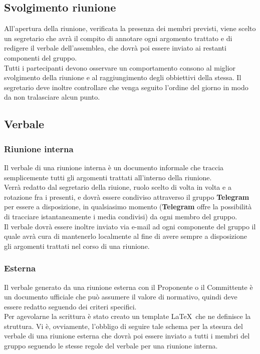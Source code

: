     \subsection{Svolgimento riunione}
      All’apertura della riunione, verificata la presenza dei membri previsti, viene scelto un segretario che avrà il compito di annotare ogni argomento trattato e di redigere il verbale
      dell’assemblea, che dovrà poi essere inviato ai restanti componenti del gruppo.\\
      Tutti i partecipanti devono osservare un comportamento consono al miglior svolgimento della riunione e al raggiungimento degli obbiettivi della stessa. Il segretario deve inoltre
      controllare che venga seguito l’ordine del giorno in modo da non tralasciare alcun punto.
    \subsection{Verbale}
      \subsubsection{Riunione interna}
        Il verbale di una riunione interna è un documento informale che traccia semplicemente tutti gli argomenti trattati all'interno della riunione.\\
        Verrà redatto dal segretario della riuione, ruolo scelto di volta in volta e a rotazione fra i presenti, e dovrà essere condiviso attraverso il gruppo \textbf{Telegram}
        per essere a disposizione, in qualsiasimo momento (\textbf{Telegram} offre la possibilità di tracciare istantaneamente i media condivisi) da ogni membro del gruppo.\\
        Il verbale dovrà essere inoltre inviato via e-mail ad ogni componente del gruppo il quale avrà cura di mantenerlo localmente al fine di avere sempre a disposizione
        gli argomenti trattati nel corso di una riunione.
      \subsubsection{Esterna}
        Il verbale generato da una riunione esterna con il Proponente o il Committente è un documento ufficiale che può assumere il valore di normativo, quindi deve essere redatto
        seguendo dei criteri specifici.\\
        Per agevolarne la scrittura è stato creato un template \LaTeX\ che ne definisce la struttura.
        Vi è, ovviamente, l'obbligo di seguire tale schema per la stesura del verbale di una riunione esterna che dovrà poi essere inviato a tutti i membri del gruppo seguendo
        le stesse regole del verbale per una riunione interna.
